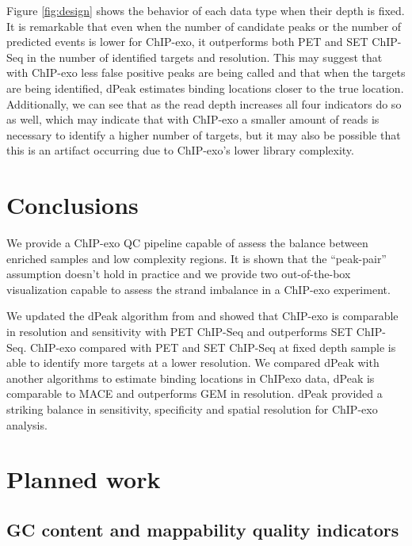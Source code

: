 \documentclass[11pt]{article}\usepackage[]{graphicx}\usepackage[]{color}
\begin{document}
Figure \ref{fig:design} shows the behavior of each data type when
their depth is fixed. It is remarkable that even when the number of
candidate peaks or the number of predicted events is lower for
ChIP-exo, it outperforms both PET and SET ChIP-Seq in the number of
identified targets and resolution. This may suggest that with ChIP-exo
less false positive peaks are being called and that when the targets
are being identified, dPeak estimates binding locations closer to the
true location. Additionally, we can see that as the read depth
increases all four indicators do so as well, which may indicate that
with ChIP-exo a smaller amount of reads is necessary to identify a
higher number of targets, but it may also be possible that this is an
artifact occurring due to ChIP-exo's lower library complexity.


\section{Conclusions}
\label{sec:conclusions}

We provide a ChIP-exo QC pipeline capable of assess the balance between
enriched samples and low complexity regions. It is shown that the
``peak-pair'' assumption doesn't hold in practice and we provide two
out-of-the-box visualization capable to assess the strand imbalance in
a ChIP-exo experiment.

We updated the dPeak algorithm from \cite{dpeak} and showed that
ChIP-exo is comparable in resolution and sensitivity with PET ChIP-Seq
and outperforms SET ChIP-Seq. ChIP-exo compared with PET and SET
ChIP-Seq at fixed depth sample is able to identify more targets at a
lower resolution. We compared dPeak with another algorithms to
estimate binding locations in ChIPexo data, dPeak is comparable to
MACE and outperforms GEM in resolution. dPeak provided a striking
balance in sensitivity, specificity and spatial resolution for
ChIP-exo analysis.


\newpage


\section{Planned work}
\label{sec:future}

\subsection{GC content and mappability quality indicators}
\label{sec:gc_map_qc}
\end{document}
